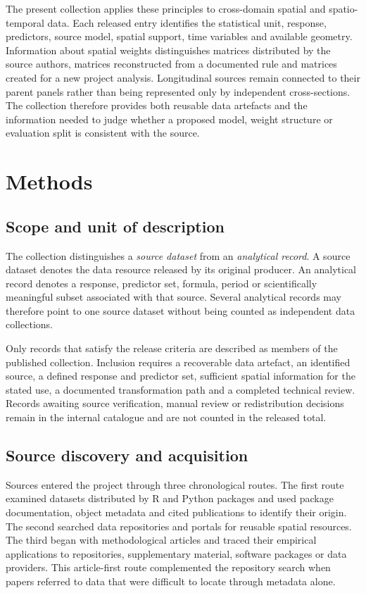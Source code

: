 \documentclass[10pt,a4paper]{article}
\begin{document}
The present collection applies these principles to cross-domain spatial and
spatio-temporal data. Each released entry identifies the statistical unit,
response, predictors, source model, spatial support, time variables and
available geometry. Information about spatial weights distinguishes matrices
distributed by the source authors, matrices reconstructed from a documented
rule and matrices created for a new project analysis. Longitudinal sources
remain connected to their parent panels rather than being represented only by
independent cross-sections. The collection therefore provides both reusable
data artefacts and the information needed to judge whether a proposed model,
weight structure or evaluation split is consistent with the source.

\section*{Methods}

\subsection*{Scope and unit of description}

The collection distinguishes a \emph{source dataset} from an
\emph{analytical record}. A source dataset denotes the data resource released
by its original producer. An analytical record denotes a response,
predictor set, formula, period or scientifically meaningful subset associated
with that source. Several analytical records may therefore point to one
source dataset without being counted as independent data collections.

Only records that satisfy the release criteria are described as members of
the published collection. Inclusion requires a recoverable data artefact, an
identified source, a defined response and predictor set, sufficient spatial
information for the stated use, a documented transformation path and a
completed technical review. Records awaiting source verification, manual
review or redistribution decisions remain in the internal catalogue and are
not counted in the released total.

\subsection*{Source discovery and acquisition}

Sources entered the project through three chronological routes. The first
route examined datasets distributed by R and Python packages and used package
documentation, object metadata and cited publications to identify their
origin. The second searched data repositories and portals for reusable
spatial resources. The third began with methodological articles and traced
their empirical applications to repositories, supplementary material,
software packages or data providers. This article-first route complemented
the repository search when papers referred to data that were difficult to
locate through metadata alone.
\end{document}

